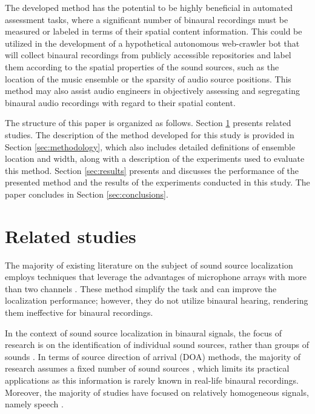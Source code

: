 \documentclass{article}
\begin{document}
The developed method has the potential to be highly beneficial in automated assessment tasks, where a significant number of binaural recordings must be measured or labeled in terms of their spatial content information. This could be utilized in the development of a hypothetical autonomous web-crawler bot that will collect binaural recordings from publicly accessible repositories and label them according to the spatial properties of the sound sources, such as the location of the music ensemble or the sparsity of audio source positions. This method may also assist audio engineers in objectively assessing and segregating binaural audio recordings with regard to their spatial content.

The structure of this paper is organized as follows. Section \ref{sec:related-studies} presents related studies. The description of the method developed for this study is provided in Section \ref{sec:methodology}, which also includes detailed definitions of ensemble location and width, along with a description of the experiments used to evaluate this method. Section \ref{sec:results} presents and discusses the performance of the presented method and the results of the experiments conducted in this study. The paper concludes in Section \ref{sec:conclusions}.

\section{Related studies}
\label{sec:related-studies}

The majority of existing literature on the subject of sound source localization employs techniques that leverage the advantages of microphone arrays with more than two channels \parencite{kaveh_statistical_1986, pavlidi_real-time_2012, pan_multi-tone_2021, hahmann_sound_2022, chung_sound_2022, liu_sound_2022}. These method simplify the task and can improve the localization performance; however, they do not utilize binaural hearing, rendering them ineffective for binaural recordings.

In the context of sound source localization in binaural signals, the  focus of research is on the identification of individual sound sources, rather than groups of sounds \parencite{dietz_auditory_2011, may_probabilistic_2011, may_binaural_2012, woodruff_binaural_2012, may_robust_2015, ma16c_interspeech, ma_exploiting_2017, benaroya_binaural_2018}. In terms of source direction of arrival (DOA) methods, the majority of research assumes a fixed number of sound sources \parencite{pang_multitask_2019, vera-diaz_towards_2018, ma_exploiting_2017, woodruff_binaural_2012, arthi_spatiogram_2021}, which limits its practical applications as this information is rarely known in real-life binaural recordings. Moreover, the majority of studies have focused on relatively homogeneous signals, namely speech \parencite{dietz_auditory_2011, may_probabilistic_2011, may_binaural_2012, woodruff_binaural_2012, may_robust_2015, ma16c_interspeech, ma_exploiting_2017, benaroya_binaural_2018, wang_binaural_2020, liu_multiple_2018, yang_deepear_2022, ma_robust_2018}.
\end{document}
